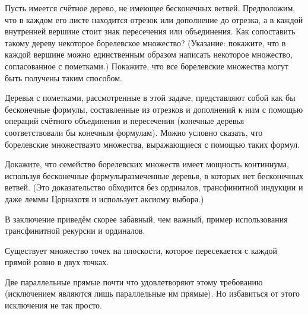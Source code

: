 \problskip
\begin{problem}
Пусть имеется счётное дерево, не имеющее бесконечных ветвей.
Предположим, что в каждом его листе находится отрезок или
дополнение до отрезка, а в каждой внутренней вершине стоит знак
пересечения или объединения. Как сопоставить такому дереву
некоторое борелевское множество? (Указание: покажите, что в
каждой вершине можно единственным образом написать некоторое
множество, согласованное с пометками.) Покажите, что все
борелевские множества могут быть получены таким способом.
\end{problem}

Деревья с пометками, рассмотренные в этой задаче, представляют
собой как бы бесконечные формулы, составленные из отрезков
и дополнений к ним с помощью операций счётного объединения
и пересечения (конечные деревья соответствовали бы
конечным формулам). Можно условно сказать, что борелевские
множества\т это множества, выражающиеся с помощью таких
формул.

\begin{problem}
Докажите, что семейство борелевских множеств имеет мощность
континнума, используя  бесконечные формулы\т размеченные
деревья, в которых нет бесконечных ветвей. (Это доказательство
обходится без ординалов, трансфинитной индукции и даже леммы
Цорна\т хотя и использует аксиому выбора.)
\end{problem}

\medskip

В заключение приведём скорее забавный, чем важный, пример
использования трансфинитной рекурсии и ординалов.

\begin{theorem}
        \label{funny-set}
Существует множество точек на плоскости, которое
пересекается с каждой прямой ровно в двух точках.
\end{theorem}

Две параллельные прямые почти что удовлетворяют этому требованию
(исключением являются лишь параллельные им прямые). Но
избавиться от этого исключения не так просто.

